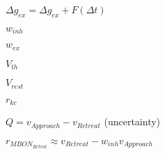 $\Delta g_{ex} = \Delta g_{ex} + F(\Delta t)$

$w_{inh}$

$w_{ex}$

$V_{th}$

$V_{rest}$

$r_{kc}$

$Q = v_{Approach} - v_{Retreat}$ (uncertainty)


$r_{MBON_{Retrat}} \approx v_{Retreat} - w_{inh} v_{Approach} $
